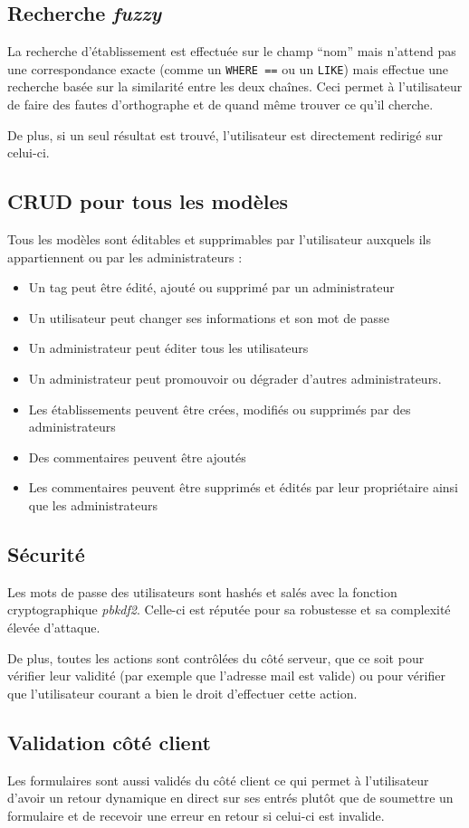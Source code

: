 \documentclass[10pt,a4paper]{article}
\begin{document}
\subsection{Recherche \textit{fuzzy}}

La recherche d'établissement est effectuée sur le champ ``nom'' mais n'attend pas une correspondance exacte (comme un \texttt{WHERE ==} ou un \texttt{LIKE}) mais effectue une recherche basée sur la similarité entre les deux chaînes. Ceci permet à l'utilisateur de faire des fautes d'orthographe et de quand même trouver ce qu'il cherche.

De plus, si un seul résultat est trouvé, l'utilisateur est directement redirigé sur celui-ci.

\subsection{CRUD pour tous les modèles}

Tous les modèles sont éditables et supprimables par l'utilisateur auxquels ils appartiennent ou par les administrateurs :

\begin{itemize}
    \item Un tag peut être édité, ajouté ou supprimé par un administrateur
    \item Un utilisateur peut changer ses informations et son mot de passe
    \item Un administrateur peut éditer tous les utilisateurs
    \item Un administrateur peut promouvoir ou dégrader d'autres administrateurs.
    \item Les établissements peuvent être crées, modifiés ou supprimés par des administrateurs
    \item Des commentaires peuvent être ajoutés
    \item Les commentaires peuvent être supprimés et édités par leur propriétaire ainsi que les administrateurs
\end{itemize}

\subsection{Sécurité}

Les mots de passe des utilisateurs sont hashés et salés avec la fonction cryptographique \textit{pbkdf2}. Celle-ci est réputée pour sa robustesse et sa complexité élevée d'attaque.

De plus, toutes les actions sont contrôlées du côté serveur, que ce soit pour vérifier leur validité (par exemple que l'adresse mail est valide) ou pour vérifier que l'utilisateur courant a bien le droit d'effectuer cette action.

\subsection{Validation côté client}

Les formulaires sont aussi validés du côté client ce qui permet à l'utilisateur d'avoir un retour dynamique en direct sur ses entrés plutôt que de soumettre un formulaire et de recevoir une erreur en retour si celui-ci est invalide.
\end{document}
